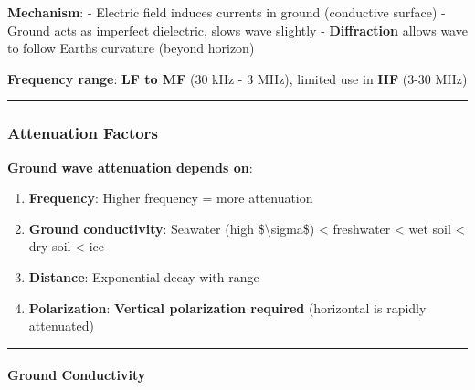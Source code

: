 \textbf{Mechanism}: - Electric field induces currents in ground
(conductive surface) - Ground acts as imperfect dielectric, slows wave
slightly - \textbf{Diffraction} allows wave to follow
Earth\textquotesingle s curvature (beyond horizon)

\textbf{Frequency range}: \textbf{LF to MF} (30 kHz - 3 MHz), limited
use in \textbf{HF} (3-30 MHz)

\begin{center}\rule{0.5\linewidth}{0.5pt}\end{center}

\subsubsection{Attenuation Factors}\label{attenuation-factors}

\textbf{Ground wave attenuation depends on}:

\begin{enumerate}
\def\labelenumi{\arabic{enumi}.}
\tightlist
\item
  \textbf{Frequency}: Higher frequency = more attenuation
\item
  \textbf{Ground conductivity}: Seawater (high \$\textbackslash sigma\$)
  \textless{} freshwater \textless{} wet soil \textless{} dry soil
  \textless{} ice
\item
  \textbf{Distance}: Exponential decay with range
\item
  \textbf{Polarization}: \textbf{Vertical polarization required}
  (horizontal is rapidly attenuated)
\end{enumerate}

\begin{center}\rule{0.5\linewidth}{0.5pt}\end{center}

\paragraph{Ground Conductivity}\label{ground-conductivity}

